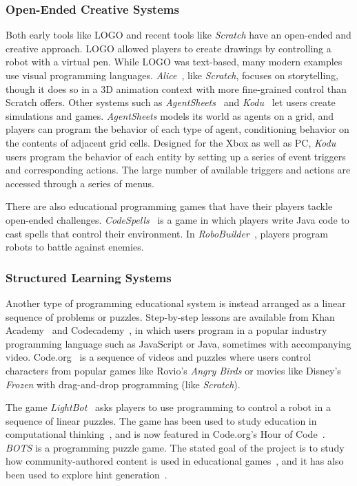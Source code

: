\documentclass{sig-alternate}
\begin{document}
\subsubsection{Open-Ended Creative Systems}
Both early tools like LOGO and recent tools like \emph{Scratch} have an open-ended and creative approach.
LOGO allowed players to create drawings by controlling a robot with a virtual pen.
While LOGO was text-based, many modern examples use visual programming languages. 
\emph{Alice}~\cite{cooper2000alice}, like \emph{Scratch}, focuses on storytelling, though it does so in a 3D animation context with more fine-grained control than Scratch offers.
Other systems such as \emph{AgentSheets}~\cite{repenning2000agentsheets} and \emph{Kodu}~\cite{kodu} let users create simulations and games.
\emph{AgentSheets} models its world as agents on a grid, and players can program the behavior of each type of agent, conditioning behavior on the contents of adjacent grid cells. 
Designed for the Xbox as well as PC, \emph{Kodu} users program the behavior of each entity by setting up a series of event triggers and corresponding actions. The large number of available triggers and actions are accessed through a series of menus. 

There are also educational programming games that have their players tackle open-ended challenges.
\emph{CodeSpells}~\cite{esper2013codespells} is a game in which players write Java code to cast spells that control their environment. 
In \emph{RoboBuilder}~\cite{weintrop2013robobuilder}, players program robots to battle against enemies.

\subsubsection{Structured Learning Systems}
Another type of programming educational system is instead arranged as a linear sequence of problems or puzzles.
Step-by-step lessons are available from Khan Academy~\cite{khanacademy} and Codecademy~\cite{codecademy}, in which users program in a popular industry programming language such as JavaScript or Java, sometimes with accompanying video.
Code.org~\cite{codedotorg} is a sequence of videos and puzzles where users control characters from popular games like Rovio's \emph{Angry Birds} or movies like Disney's \emph{Frozen} with drag-and-drop programming (like \emph{Scratch}).

The game \emph{LightBot}~\cite{lightbot} asks players to use programming to control a robot in a sequence of linear puzzles.
The game has been used to study education in computational thinking~\cite{Gouws13Lightbot}, and is now featured in Code.org's Hour of Code~\cite{lightbothoc}.
\emph{BOTS} is a programming puzzle game. The stated goal of the project is to study how community-authored content is used in educational games~\cite{hickspart14}, and it has also been used to explore hint generation~\cite{peddycord14generating}.
\end{document}
